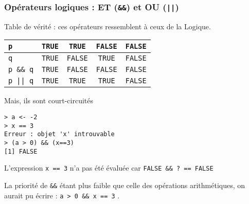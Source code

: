 \documentclass[10pt]{beamer}
\newcommand{\T}{\texttt{TRUE}}
\newcommand{\F}{\texttt{FALSE}}
\begin{document}


\begin{frame}[fragile]
  \frametitle{Opérateurs logiques : ET (\texttt{\&\&}) et OU (\texttt{||})}
  \begin{block}{Table de vérité : ces opérateurs ressemblent à ceux de la Logique.}
  \begin{table}
    \centering
    \begin{tabular}{|l|c|c|c|c|}
      \hline
      \texttt{p}        & \T & \T & \F & \F \\ \hline
      \texttt{q}        & \T & \F & \T & \F \\ \hline
      \texttt{p \&\& q} & \T & \F & \F & \F \\ \hline
      \texttt{p || q} & \T & \T & \T & \F \\ \hline
    \end{tabular}
  \end{table}
\end{block}


\begin{block}{Mais, ils sont court-circuités}
  \begin{lstlisting}[style=block]
> a <- -2
> x == 3
Erreur : objet 'x' introuvable
> (a > 0) && (x==3)
[1] FALSE
\end{lstlisting}
L'expression \lstinline[columns=fixed]{x == 3} n'a pas été évaluée car \texttt{FALSE \&\& ? == FALSE}

La priorité de \texttt{\&\&} étant plus faible que celle des opérations arithmétiques,
on aurait pu écrire : \lstinline[columns=fixed]{a > 0 && x == 3} .

\end{block}
\end{frame}
\end{document}
